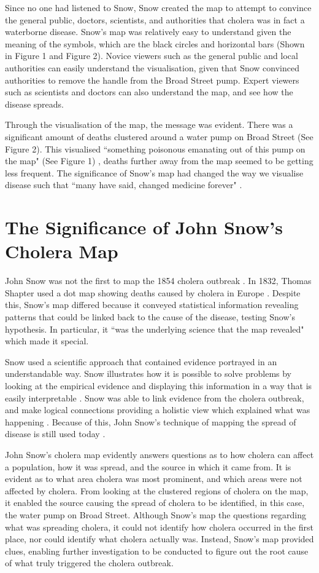 \documentclass[12pt]{article}
\begin{document}
Since no one had listened to Snow, Snow created the map to attempt to convince the general public, doctors, scientists, and authorities that cholera was in fact a waterborne disease. Snow's map was relatively easy to understand given the meaning of the symbols, which are the black circles and horizontal bars (Shown in Figure 1 and Figure 2). Novice viewers such as the general public and local authorities can easily understand the visualisation, given that Snow convinced authorities to remove the handle from the Broad Street pump. Expert viewers such as scientists and doctors can also understand the map, and see how the disease spreads. 

Through the visualisation of the map, the message was evident. There was a significant amount of deaths clustered around a water pump on Broad Street (See Figure 2). This visualised ``something poisonous emanating out of this pump on the map" (See Figure 1) \cite{blog}, deaths further away from the map seemed to be getting less frequent. The significance of Snow's map had changed the way we visualise disease such that ``many have said, changed medicine forever" \cite{heros}.

\section{The Significance of John Snow's Cholera Map}

John Snow was not the first to map the 1854 cholera outbreak \cite{history, johnson}. In 1832, Thomas Shapter used a dot map showing deaths caused by cholera in Europe \cite{howe1970some}. Despite this, Snow's map differed because it conveyed statistical information revealing patterns that could be linked back to the cause of the disease, testing Snow's hypothesis. In particular, it ``was the underlying science that the map revealed" \cite{johnson, history} which made it special.

Snow used a scientific approach that contained evidence portrayed in an understandable way. Snow illustrates how it is possible to solve problems by looking at the empirical evidence and displaying this information in a way that is easily interpretable \cite{tedtalk}. Snow was able to link evidence from the cholera outbreak, and make logical connections providing a holistic view which explained what was happening \cite{channel1,blog}. Because of this, John Snow's technique of mapping the spread of disease is still used today \cite{channel1}. 

John Snow's cholera map evidently answers questions as to how cholera can affect a population, how it was spread, and the source in which it came from. It is evident as to what area cholera was most prominent, and which areas were not affected by cholera. From looking at the clustered regions of cholera on the map, it enabled the source causing the spread of cholera to be identified, in this case, the water pump on Broad Street. Although Snow's map the questions regarding what was spreading cholera, it could not identify how cholera occurred in the first place, nor could identify what cholera actually was. Instead, Snow's map provided clues, enabling further investigation to be conducted to figure out the root cause of what truly triggered the cholera outbreak.  
\end{document}
